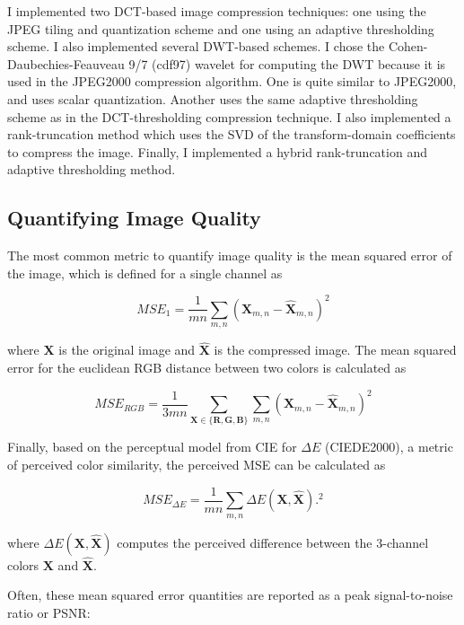 \documentclass[conference]{IEEEtran}
\begin{document}
I implemented two DCT-based image compression techniques: one using the JPEG tiling and quantization scheme and one using an adaptive thresholding scheme.
I also implemented several DWT-based schemes.
I chose the Cohen-Daubechies-Feauveau 9/7 (cdf97) wavelet for computing the DWT because it is used in the JPEG2000 compression algorithm.
One is quite similar to JPEG2000, and uses scalar quantization.
Another uses the same adaptive thresholding scheme as in the DCT-thresholding compression technique.
I also implemented a rank-truncation method which uses the SVD of the transform-domain coefficients to compress the image.
Finally, I implemented a hybrid rank-truncation and adaptive thresholding method.

\subsection{Quantifying Image Quality}

The most common metric to quantify image quality is the mean squared error of the image, which is defined for a single channel as

\begin{equation}
    MSE_{1} = \frac{1}{mn}\sum_{m,n}\left(\mathbf{X}_{m,n} - \mathbf{\hat{X}}_{m,n}\right)^2
\end{equation}

where $\mathbf{X}$ is the original image and $\mathbf{\hat{X}}$ is the compressed image.
The mean squared error for the euclidean RGB distance between two colors is calculated as

\begin{equation}
    MSE_{RGB} = \frac{1}{3mn}\sum_{\mathbf{X}\in\{\mathbf{R},\mathbf{G},\mathbf{B}\}}\sum_{m,n}\left(\mathbf{X}_{m,n} - \mathbf{\hat{X}}_{m,n}\right)^2
\end{equation}

Finally, based on the perceptual model from CIE for $\Delta E$ (CIEDE2000), a metric of perceived color similarity, the perceived MSE can be calculated as

\begin{equation}
    MSE_{\Delta E} = \frac{1}{mn}\sum_{m,n}\Delta E\left(\mathbf{X}, \mathbf{\hat{X}}\right).^2
\end{equation}

where $\Delta E(\mathbf{X}, \mathbf{\hat{X}})$ computes the perceived difference between the 3-channel colors $\mathbf{X}$ and $\mathbf{\hat{X}}$.

Often, these mean squared error quantities are reported as a peak signal-to-noise ratio or PSNR:
\end{document}
